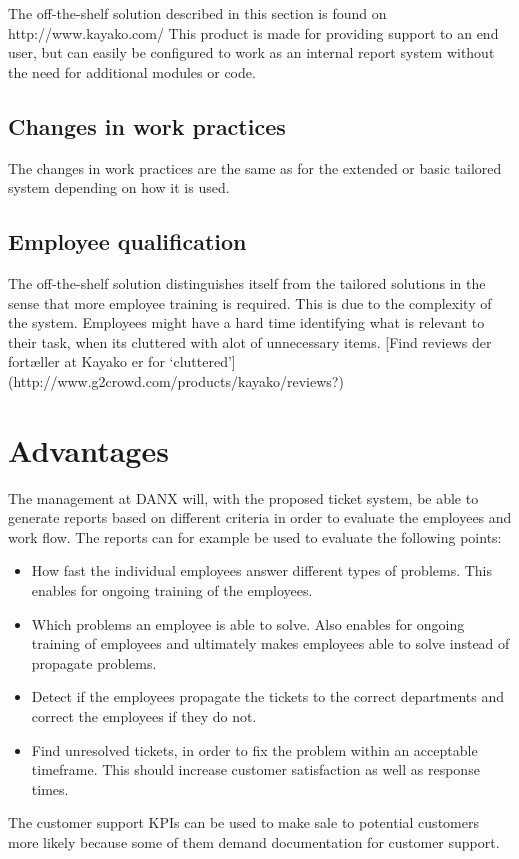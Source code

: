 The off-the-shelf solution described in this section is found on http://www.kayako.com/
This product is made for providing support to an end user, but can easily be configured to work as an internal report system without the need for additional modules or code.

\subsection{Changes in work practices}
The changes in work practices are the same as for the extended or basic tailored system depending on how it is used.
\subsection{Employee qualification}
The off-the-shelf solution distinguishes itself from the tailored solutions in the sense that more employee training is required. This is due to the complexity of the system.
Employees might have a hard time identifying what is relevant to their task, when its cluttered with alot of unnecessary items. [Find reviews der fortæller at Kayako er for ‘cluttered’] (http://www.g2crowd.com/products/kayako/reviews?)

\section{Advantages}
The management at DANX will, with the proposed ticket system, be able to generate reports based on different criteria in order to evaluate the employees and work flow. The reports can for example be used to evaluate the following points:
\begin{itemize}
	\item How fast the individual employees answer different types of problems. This enables for ongoing training of the employees.
	\item Which problems an employee is able to solve. Also enables for ongoing training of employees and ultimately makes employees able to solve instead of propagate problems.
\item Detect if the employees propagate the tickets to the correct departments and correct the employees if they do not.
\item Find unresolved tickets, in order to fix the problem within an acceptable timeframe. This should increase customer satisfaction as well as response times.
\end{itemize}
The customer support KPIs can be used to make sale to potential customers more likely because some of them demand documentation for customer support.

